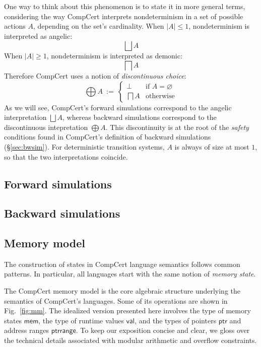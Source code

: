 \documentclass[11pt,oneside,draft]{book}
\theoremstyle{definition}
\newcommand{\kw}[1]{\ensuremath{ \mathsf{#1} }}
\begin{document}
One way to think about this phenomenon is to state it
in more general terms,
considering the way CompCert interprets nondeterminism
in a set of possible actions $A$,
depending on the set's cardinality.
When $|A| \le 1$, nondeterminism is interpreted as angelic:
\[
  \bigsqcup A
\]
When $|A| \ge 1$, nondeterminism is interpreted as demonic:
\[
  \bigsqcap A
\]
Therefore CompCert uses a notion of
\emph{discontinuous choice}:
\[
  \bigoplus A \: := \:
  \begin{cases}
    \bot & \mbox{if } A = \varnothing \\
    \bigsqcap A & \mbox{otherwise}
  \end{cases}
\]
As we will see,
CompCert's forward simulations
correspond to the angelic interpretation $\bigsqcup A$,
whereas backward simulations
correspond to the discontinuous intepretation $\bigoplus A$.
This discontinuity is at the root of the \emph{safety} conditions
found in CompCert's definition of backward simulations
(\S\ref{sec:bwsim}).
For deterministic transition systems,
$A$ is always of size at most $1$,
so that the two interpretations coincide.


\subsection{Forward simulations} \label{sec:fsim}

\subsection{Backward simulations} \label{sec:bsim}

\subsection{Memory model} \label{sec:sem:mm} %

The construction of states in CompCert language semantics
follows common patterns.
In particular,
all languages start with
the same notion of \emph{memory state}.

The CompCert memory model \citep{compcertmm,compcertmmv2}
is the core algebraic structure
underlying the semantics of CompCert's languages.
Some of its operations
are shown in Fig.~\ref{fig:mm}.
The idealized version presented here
involves
the type of memory states \kw{mem},
the type of runtime values \kw{val}, and
the types of pointers \kw{ptr} and address ranges \kw{ptrrange}.
To keep our exposition concise and clear,
we gloss over the technical details
associated with modular arithmetic and overflow constraints.
\end{document}
